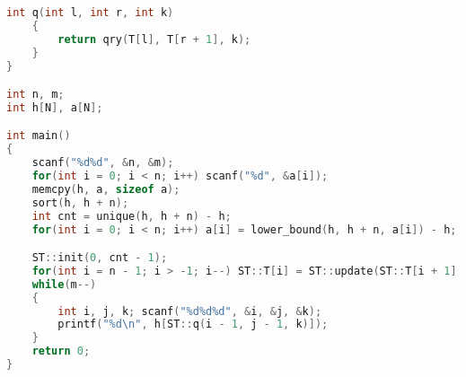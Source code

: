 \begin{lstlisting}[language=C++]
    int q(int l, int r, int k)
    {
        return qry(T[l], T[r + 1], k);
    }
}

int n, m;
int h[N], a[N];

int main()
{
	scanf("%d%d", &n, &m);
    for(int i = 0; i < n; i++) scanf("%d", &a[i]);
    memcpy(h, a, sizeof a);
    sort(h, h + n);
    int cnt = unique(h, h + n) - h;
    for(int i = 0; i < n; i++) a[i] = lower_bound(h, h + n, a[i]) - h;

    ST::init(0, cnt - 1);
    for(int i = n - 1; i > -1; i--) ST::T[i] = ST::update(ST::T[i + 1], a[i]);
    while(m--)
    {
        int i, j, k; scanf("%d%d%d", &i, &j, &k);
        printf("%d\n", h[ST::q(i - 1, j - 1, k)]);
    }
    return 0;
}
	
\end{lstlisting}